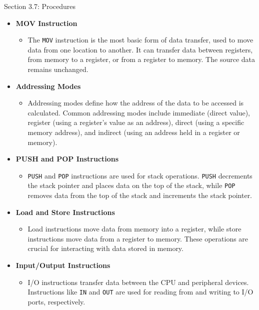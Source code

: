 \begin{notes}{Section 3.7: Procedures}
    \begin{itemize}
        \item \textbf{MOV Instruction}
        \begin{itemize}
            \item The \texttt{MOV} instruction is the most basic form of data transfer, used to move data from one location to another. It can transfer data between registers, from memory to a register, 
            or from a register to memory. The source data remains unchanged.
        \end{itemize}
        \item \textbf{Addressing Modes}
        \begin{itemize}
            \item Addressing modes define how the address of the data to be accessed is calculated. Common addressing modes include immediate (direct value), register (using a register's value as an 
            address), direct (using a specific memory address), and indirect (using an address held in a register or memory).
        \end{itemize}
        \item \textbf{PUSH and POP Instructions}
        \begin{itemize}
            \item \texttt{PUSH} and \texttt{POP} instructions are used for stack operations. \texttt{PUSH} decrements the stack pointer and places data on the top of the stack, while \texttt{POP} 
            removes data from the top of the stack and increments the stack pointer.
        \end{itemize}
        \item \textbf{Load and Store Instructions}
        \begin{itemize}
            \item Load instructions move data from memory into a register, while store instructions move data from a register to memory. These operations are crucial for interacting with data stored 
            in memory.
        \end{itemize}
        \item \textbf{Input/Output Instructions}
        \begin{itemize}
            \item I/O instructions transfer data between the CPU and peripheral devices. Instructions like \texttt{IN} and \texttt{OUT} are used for reading from and writing to I/O ports, respectively.
        \end{itemize}

\end{itemize}
\end{notes}

